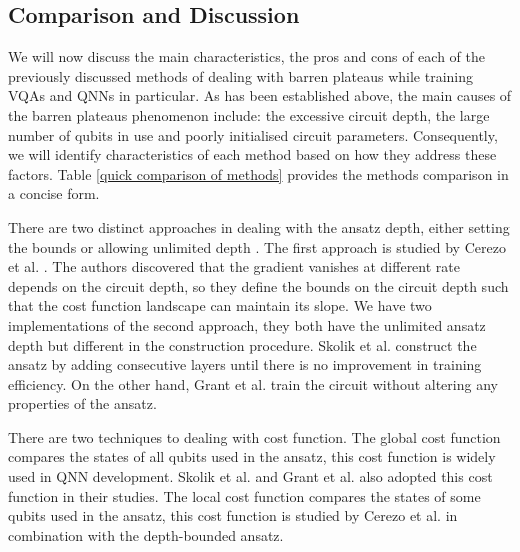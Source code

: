 \subsection{Comparison and Discussion}
We will now discuss the main characteristics, the pros and cons of each of the previously discussed methods of dealing with barren plateaus while training VQAs and QNNs in particular.
As has been established above, the main causes of the barren plateaus phenomenon include: the excessive circuit depth, the large number of qubits in use and poorly initialised circuit parameters.
Consequently, we will identify characteristics of each method based on how they address these factors.
Table \ref{quick comparison of methods} provides the methods comparison in a concise form.

There are two distinct approaches in dealing with the ansatz depth, either setting the bounds \cite{cerezoCostFunctionDependent2021} or allowing unlimited depth \cite{skolikLayerwiseLearningQuantum2021, grantInitializationStrategyAddressing2019}.
The first approach is studied by Cerezo et al. \cite{cerezoCostFunctionDependent2021}.
The authors discovered that the gradient vanishes at different rate depends on the circuit depth, so they define the bounds on the circuit depth such that the cost function landscape can maintain its slope.
We have two implementations of the second approach, they both have the unlimited ansatz depth but different in the construction procedure.
Skolik et al. \cite{skolikLayerwiseLearningQuantum2021} construct the ansatz by adding consecutive layers until there is no improvement in training efficiency.
On the other hand, Grant et al. \cite{grantInitializationStrategyAddressing2019} train the circuit without altering any properties of the ansatz.

There are two techniques to dealing with cost function.
The global cost function compares the states of all qubits used in the ansatz, this cost function is widely used in QNN development.
Skolik et al. and Grant et al. also adopted this cost function in their studies.
The local cost function compares the states of some qubits used in the ansatz, this cost function is studied by Cerezo et al. \cite{cerezoCostFunctionDependent2021} in combination with the depth-bounded ansatz.

